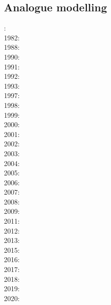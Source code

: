 \subsection{Analogue modelling}

{\scriptsize
{}: \cite{dixo75}\\
1982: \cite{tapl82}\\
1988: \cite{peta88}\cite{crud88}\\
1990: \cite{mccl90}\cite{jodc90}\\
1991: \cite{daco91}\\
1992: \cite{salt92}\\
1993: \cite{nabr93}\cite{shem93}\\
1997: \cite{vank97}\\
1998: \cite{bubr98}\\
1999: \cite{dava99}\cite{befo99}\cite{fagd99}\cite{nagg99}\\
2000: \cite{sche00}\cite{sobm00}\cite{chlb00}\\
2001: \cite{haki01}\cite{chys01}\\
2002: \cite{dagl02}\\
2003: \cite{smbs03}\cite{muso03}\cite{nagv03}\\
2004: \cite{sche04}\cite{sche04b}\\
2005: \cite{jujb05}\cite{sche05}\cite{sobb05}\\
2006: \cite{scbb06}\cite{tibs06}\cite{crnp06}\cite{lemm06}\cite{pabs06}\cite{malm06}\\
2007: \cite{socb07}\\
2008: \cite{clbz08}\cite{fufh08}\cite{esfm08}\\
2009: \cite{pina09}\cite{bonn09}\\
2011: \cite{dalt11}\cite{gopc11}\cite{grhd11}\\
2012: \cite{grmd12}\cite{iadc12}\\
2013: \cite{luws13}\cite{vadv13}\cite{guhf13}\cite{mibg13}\cite{mesc13}\cite{dusc13}\cite{kern13}\\
2015: \cite{casw15}\cite{rods15}\cite{kiff15}\cite{chsd15}\\
2016: \cite{scbb16}\cite{chss16}\\
2017: \cite{casw17}\\
2018: \cite{pirf18}\\
2019: \cite{mocb19}\cite{sccs19}\cite{muwm19}\cite{fegb19}\\
2020: \cite{zwsr20}
}

